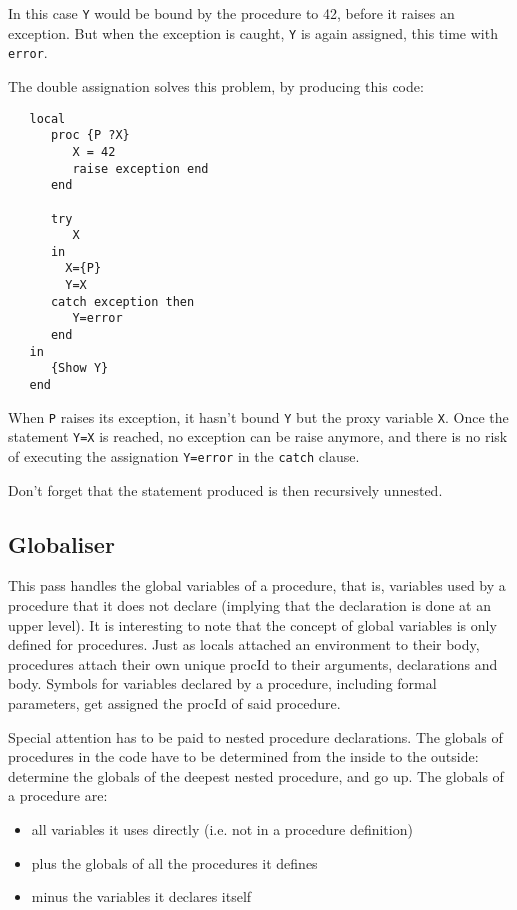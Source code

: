\documentclass[a4paper]{memoir}
\begin{document}
In this case \lstinline!Y! would be bound by
the procedure to 42, before it raises an exception. 
But when the exception is caught, \lstinline!Y! is again
assigned, this time with \lstinline!error!.

The double assignation solves this problem, by producing this code:
\begin{lstlisting}
   local
      proc {P ?X}
         X = 42
         raise exception end
      end
   
      try 
         X
      in 
        X={P}
        Y=X
      catch exception then
         Y=error
      end
   in
      {Show Y}
   end
\end{lstlisting}

When \lstinline!P! raises its exception, it hasn't bound \lstinline!Y! but the
proxy variable \lstinline!X!. Once the statement \lstinline!Y=X! is reached, no
exception can be raise anymore, and there is no risk of executing the
assignation \lstinline!Y=error! in the \lstinline!catch! clause.


Don't forget that the statement produced is then recursively unnested.




\subsection{Globaliser}\label{sec:arch:globaliser}            
This pass handles the global variables of a procedure, that is, variables used by a procedure that it does not declare (implying that the declaration is done at an upper level). It is interesting to note that the concept of global variables is only defined for procedures.
Just as locals attached an environment to their body, procedures attach their own unique procId to their arguments, declarations and body.
Symbols for variables declared by a procedure, including formal parameters, get assigned the procId of said procedure.

Special attention has to be paid to nested procedure declarations.
The globals of procedures in the code have to be determined from the inside to the outside: determine the globals of the deepest nested procedure, and go up. 
The globals of a procedure are:
\begin{itemize}
  \item all variables it uses directly (i.e. not in a procedure definition)
  \item plus the globals of all the procedures it defines
  \item minus the variables it declares itself
\end{itemize}
\end{document}
